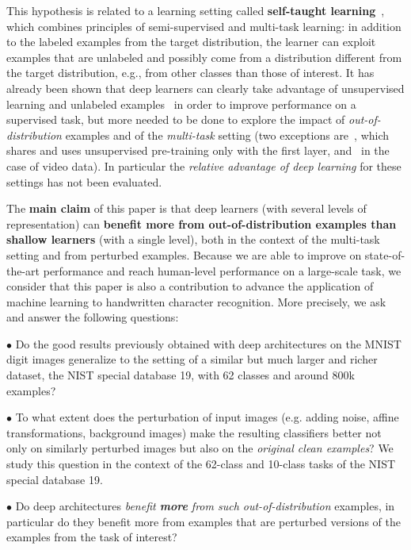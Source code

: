\documentclass{article} %
\begin{document}
This hypothesis is related to a learning setting called
{\bf self-taught learning}~\citep{RainaR2007}, which combines principles
of semi-supervised and multi-task learning: in addition to the labeled
examples from the target distribution, the learner can exploit examples
that are unlabeled and possibly come from a distribution different from the target
distribution, e.g., from other classes than those of interest. 
It has already been shown that deep learners can clearly take advantage of
unsupervised learning and unlabeled examples~\citep{Bengio-2009,WestonJ2008-small}
in order to improve performance on a supervised task,
but more needed to be done to explore the impact
of {\em out-of-distribution} examples and of the {\em multi-task} setting
(two exceptions are~\citet{CollobertR2008}, which shares and uses unsupervised
pre-training only with the first layer, and~\citet{icml2009_093} in the case
of video data). In particular the {\em relative
advantage of deep learning} for these settings has not been evaluated.


%
The {\bf main claim} of this paper is that deep learners (with several levels of representation) can
{\bf benefit more from out-of-distribution examples than shallow learners} (with a single
level), both in the context of the multi-task setting and from
 perturbed examples. Because we are able to improve on state-of-the-art
performance and reach human-level performance
on a large-scale task, we consider that this paper is also a contribution
to advance the application of machine learning to handwritten character recognition.
More precisely, we ask and answer the following questions:

$\bullet$ %
Do the good results previously obtained with deep architectures on the
MNIST digit images generalize to the setting of a similar but much larger and richer
dataset, the NIST special database 19, with 62 classes and around 800k examples?

$\bullet$ %
To what extent does the perturbation of input images (e.g. adding
noise, affine transformations, background images) make the resulting
classifiers better not only on similarly perturbed images but also on
the {\em original clean examples}? We study this question in the
context of the 62-class and 10-class tasks of the NIST special database 19.

$\bullet$ %
Do deep architectures {\em benefit {\bf more} from such out-of-distribution}
examples, in particular do they benefit more from 
examples that are perturbed versions of the examples from the task of interest?
\end{document}
